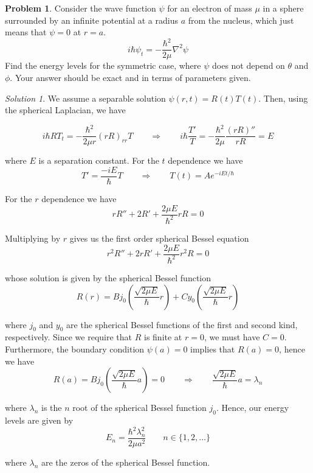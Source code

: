 \documentclass[12pt,a4paper]{article}
\theoremstyle{definition}
\newtheorem{problem}{Problem}
\theoremstyle{remark}
\newtheorem*{solution}{Solution}
\begin{document}
\begin{problem}
    Consider the wave function $\psi$ for an electron of mass $\mu$ in a sphere surrounded by an infinite potential at a radius $a$ from the nucleus, which just means that $\psi = 0$ at $r=a$. $$i \hbar \psi_t = -\frac{\hbar^2}{2\mu} \nabla^2 \psi$$
    Find the energy levels for the symmetric case, where $\psi$ does not depend on $\theta$ and $\phi$. Your answer should be exact and in terms of parameters given. 
\end{problem}
\begin{solution}
    We assume a separable solution $\psi(r, t) = R(t) T(t)$. Then, using the spherical Laplacian, we have

    $$i \hbar RT_t = - \frac{\hbar^2}{2\mu r}(rR)_{rr}T \qquad \Rightarrow \qquad i \hbar \frac{T'}{T} = - \frac{\hbar^2}{2\mu} \frac{(rR)''}{rR} = E$$

    where $E$ is a separation constant. For the $t$ dependence we have $$T' = \frac{-i E}{\hbar} T \qquad \Rightarrow \qquad T(t) = A e^{- i E t/\hbar}$$

    For the $r$ dependence we have $$ rR'' + 2R'  + \frac{2 \mu E}{\hbar^2}rR = 0$$

    Multiplying by $r$ gives us the first order spherical Bessel equation $$r^2 R'' + 2rR' + \frac{2 \mu E}{\hbar^2} r^2R = 0$$

    whose solution is given by the spherical Bessel function $$R(r) = B j_0\left(\frac{\sqrt{2\mu E}}{\hbar} r\right) + C y_0 \left(\frac{\sqrt{2\mu E}}{\hbar} r\right)$$

    where $j_0$ and $y_0$ are the spherical Bessel functions of the first and second kind, respectively. Since we require that $R$ is finite at $r =0$, we must have $C = 0$. Furthermore, the boundary condition $\psi(a) = 0$ implies that $R(a) = 0$, hence we have $$R(a) = B j_0 \left(\frac{\sqrt{2\mu E}}{\hbar} a\right) = 0 \qquad \Rightarrow \qquad \frac{\sqrt{2\mu E}}{\hbar} a = \lambda_n $$

    where $\lambda_n$ is the $n$ root of the spherical Bessel function $j_0$. Hence, our energy levels are given by $$E_n = \frac{\hbar^2 \lambda_n^2}{2 \mu a^2} \qquad n \in \{1, 2, \dots \}$$

    where $\lambda_n$ are the zeros of the spherical Bessel function. 

    
\end{solution}
\end{document}
